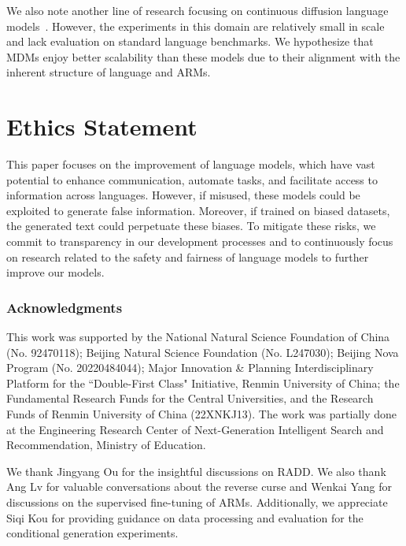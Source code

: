 \documentclass{article} %
\begin{document}
We also note another line of research focusing on continuous diffusion language models~\citep{li2022diffusion, gong2022diffuseq, han2022ssd,mahabadi2023tess, strudel2022self, chen2022analog, gulrajani2024likelihood, graves2023bayesian,xue2024unifying,dieleman2022continuous}.
However, the experiments in this domain are relatively small in scale and lack evaluation on standard language benchmarks. We hypothesize that MDMs enjoy better scalability than these models due to their alignment with the inherent structure of language and ARMs.


\section*{Ethics Statement}
This paper focuses on the improvement of language models, which have vast potential to enhance communication, automate tasks, and facilitate access to information across languages. However, if misused, these models could be exploited to generate false information. Moreover, if trained on biased datasets, the generated text could perpetuate these biases. To mitigate these risks, we commit to transparency in our development processes and to continuously focus on research related to the safety and fairness of language models to further improve our models.
 



\subsubsection*{Acknowledgments}

This work was supported by the National Natural Science Foundation of China (No. 92470118); Beijing Natural Science Foundation (No. L247030); Beijing Nova Program (No. 20220484044);  Major Innovation \& Planning Interdisciplinary Platform for the ``Double-First Class" Initiative, Renmin University of China; the Fundamental Research Funds for the Central Universities, and the Research Funds of Renmin University of China (22XNKJ13). The work was partially done at the Engineering Research Center of Next-Generation Intelligent Search and Recommendation, Ministry of Education.

We thank Jingyang Ou for the insightful discussions on RADD. We also thank Ang Lv for valuable conversations about the reverse curse and Wenkai Yang for discussions on the supervised fine-tuning of ARMs. Additionally, we appreciate Siqi Kou for providing guidance on data processing and evaluation for the conditional generation experiments.
\end{document}
